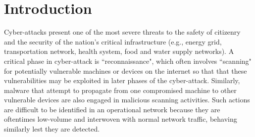 \documentclass[manuscript, nonacm]{acmart}
\begin{document}
\section{Introduction}

Cyber-attacks present one of the most severe threats to 
the safety of citizenry and the
security of the nation's
critical infrastructure (e.g., energy grid, transportation network, health system, 
food and water supply networks).
A critical phase in cyber-attack is ``reconnaissance", which often
involves ``scanning" for potentially vulnerable machines or devices on the internet 
so that that these vulnerabilities may be exploited in later phases of the 
cyber-attack.
Similarly, malware that attempt
to propagate from one compromised machine to other
vulnerable devices are also engaged in malicious
scanning activities. Such actions are difficult to be identified
in an operational network because they are oftentimes
low-volume and interwoven with normal network traffic,
behaving similarly lest they are detected.


\end{document}
